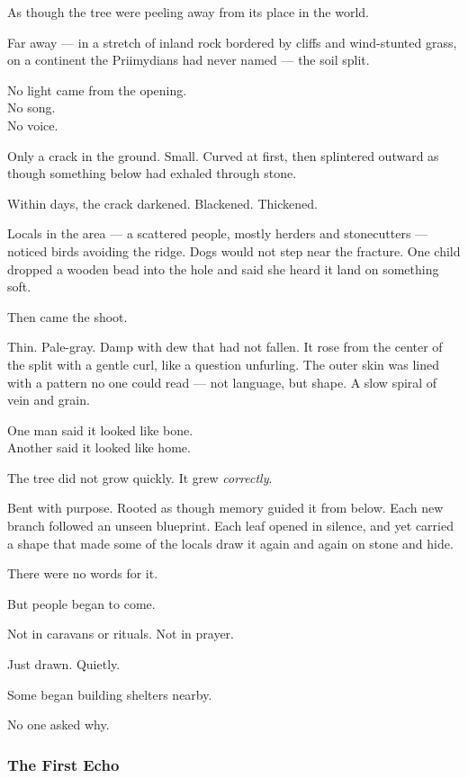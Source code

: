 \documentclass[12pt]{article}
\begin{document}
As though the tree were peeling away from its place in the world.

\vspace{1em}

Far away --- in a stretch of inland rock bordered by cliffs and wind-stunted grass, on a continent the Priimydians had never named --- the soil split.

No light came from the opening.\\
No song.\\
No voice.

Only a crack in the ground. Small. Curved at first, then splintered outward as though something below had exhaled through stone.

Within days, the crack darkened. Blackened. Thickened.

Locals in the area --- a scattered people, mostly herders and stonecutters --- noticed birds avoiding the ridge. Dogs would not step near the fracture. One child dropped a wooden bead into the hole and said she heard it land on something soft.

Then came the shoot.

Thin. Pale-gray. Damp with dew that had not fallen. It rose from the center of the split with a gentle curl, like a question unfurling. The outer skin was lined with a pattern no one could read --- not language, but shape. A slow spiral of vein and grain.

One man said it looked like bone.\\
Another said it looked like home.

\vspace{1em}

The tree did not grow quickly. It grew \textit{correctly}.

Bent with purpose. Rooted as though memory guided it from below. Each new branch followed an unseen blueprint. Each leaf opened in silence, and yet carried a shape that made some of the locals draw it again and again on stone and hide.

There were no words for it.

But people began to come.

Not in caravans or rituals. Not in prayer.

Just drawn. Quietly.

Some began building shelters nearby.

No one asked why.

\dotfill

\subsubsection{The First Echo}
\end{document}
